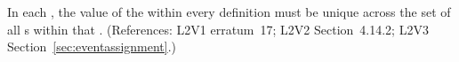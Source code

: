 In each \Event, the value of the   within every
\EventAssignment definition must be unique across the set of all
\EventAssignment{}s within that \Event.  (References: L2V1 erratum~17; 
L2V2 Section~4.14.2; L2V3 Section~\ref{sec:eventassignment}.)
